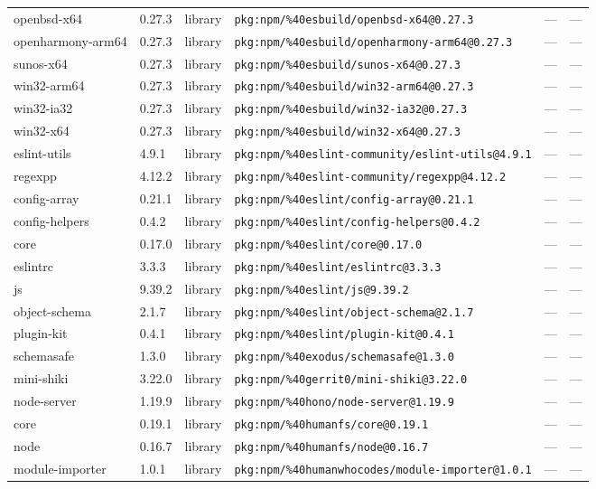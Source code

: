 \documentclass[11pt]{article}
\begin{document}
\begin{longtable}{|l|l|l|p{2.2cm}|l|p{4cm}|}
openbsd-x64 & 0.27.3 & library & \texttt{pkg:npm/\%40esbuild/openbsd-x64@0.27.3} & — & — \\
openharmony-arm64 & 0.27.3 & library & \texttt{pkg:npm/\%40esbuild/openharmony-arm64@0.27.3} & — & — \\
sunos-x64 & 0.27.3 & library & \texttt{pkg:npm/\%40esbuild/sunos-x64@0.27.3} & — & — \\
win32-arm64 & 0.27.3 & library & \texttt{pkg:npm/\%40esbuild/win32-arm64@0.27.3} & — & — \\
win32-ia32 & 0.27.3 & library & \texttt{pkg:npm/\%40esbuild/win32-ia32@0.27.3} & — & — \\
win32-x64 & 0.27.3 & library & \texttt{pkg:npm/\%40esbuild/win32-x64@0.27.3} & — & — \\
eslint-utils & 4.9.1 & library & \texttt{pkg:npm/\%40eslint-community/eslint-utils@4.9.1} & — & — \\
regexpp & 4.12.2 & library & \texttt{pkg:npm/\%40eslint-community/regexpp@4.12.2} & — & — \\
config-array & 0.21.1 & library & \texttt{pkg:npm/\%40eslint/config-array@0.21.1} & — & — \\
config-helpers & 0.4.2 & library & \texttt{pkg:npm/\%40eslint/config-helpers@0.4.2} & — & — \\
core & 0.17.0 & library & \texttt{pkg:npm/\%40eslint/core@0.17.0} & — & — \\
eslintrc & 3.3.3 & library & \texttt{pkg:npm/\%40eslint/eslintrc@3.3.3} & — & — \\
js & 9.39.2 & library & \texttt{pkg:npm/\%40eslint/js@9.39.2} & — & — \\
object-schema & 2.1.7 & library & \texttt{pkg:npm/\%40eslint/object-schema@2.1.7} & — & — \\
plugin-kit & 0.4.1 & library & \texttt{pkg:npm/\%40eslint/plugin-kit@0.4.1} & — & — \\
schemasafe & 1.3.0 & library & \texttt{pkg:npm/\%40exodus/schemasafe@1.3.0} & — & — \\
mini-shiki & 3.22.0 & library & \texttt{pkg:npm/\%40gerrit0/mini-shiki@3.22.0} & — & — \\
node-server & 1.19.9 & library & \texttt{pkg:npm/\%40hono/node-server@1.19.9} & — & — \\
core & 0.19.1 & library & \texttt{pkg:npm/\%40humanfs/core@0.19.1} & — & — \\
node & 0.16.7 & library & \texttt{pkg:npm/\%40humanfs/node@0.16.7} & — & — \\
module-importer & 1.0.1 & library & \texttt{pkg:npm/\%40humanwhocodes/module-importer@1.0.1} & — & — \\

\end{longtable}
\end{document}
